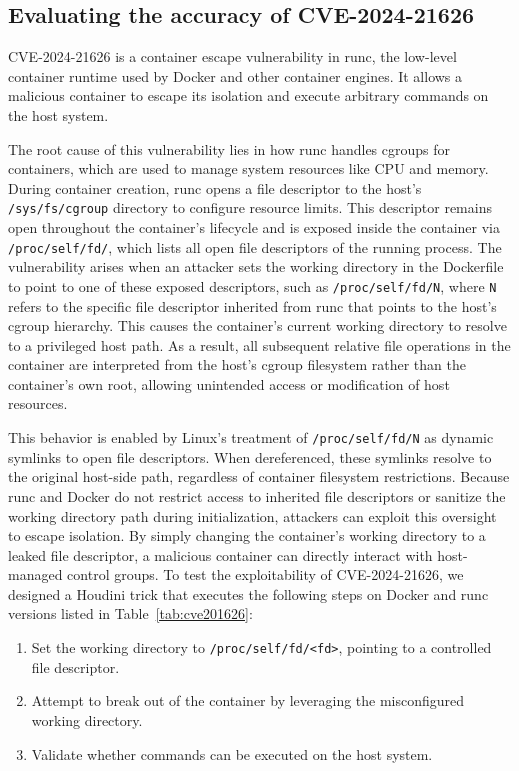 \documentclass[12pt]{report}
\begin{document}
\fontsize{12pt}{14pt} \selectfont
\begin{doublespace}




\section{Evaluating the accuracy of CVE-2024-21626}

CVE-2024-21626 \cite{runc-cve-2024-21626} is a container escape vulnerability in runc, the low-level container runtime used by Docker and other container engines. It allows a malicious container to escape its isolation and execute arbitrary commands on the host system.

The root cause of this vulnerability lies in how runc handles cgroups for containers, which are used to manage system resources like CPU and memory. During container creation, runc opens a file descriptor to the host's \texttt{/sys/fs/cgroup} directory to configure resource limits. This descriptor remains open throughout the container’s lifecycle and is exposed inside the container via \texttt{/proc/self/fd/}, which lists all open file descriptors of the running process. The vulnerability arises when an attacker sets the working directory in the Dockerfile to point to one of these exposed descriptors, such as \texttt{/proc/self/fd/N}, where \texttt{N} refers to the specific file descriptor inherited from runc that points to the host’s cgroup hierarchy. This causes the container’s current working directory to resolve to a privileged host path. As a result, all subsequent relative file operations in the container are interpreted from the host’s cgroup filesystem rather than the container’s own root, allowing unintended access or modification of host resources.

This behavior is enabled by Linux's treatment of \texttt{/proc/self/fd/N} as dynamic symlinks to open file descriptors. When dereferenced, these symlinks resolve to the original host-side path, regardless of container filesystem restrictions. Because runc and Docker do not restrict access to inherited file descriptors or sanitize the working directory path during initialization, attackers can exploit this oversight to escape isolation. By simply changing the container's working directory to a leaked file descriptor, a malicious container can directly interact with host-managed control groups.
To test the exploitability of CVE-2024-21626, we designed a Houdini trick that executes the following steps on Docker and runc versions listed in Table~\ref{tab:cve201626}:
\begin{enumerate}
    \item Set the working directory to \texttt{/proc/self/fd/<fd>}, pointing to a controlled file descriptor.
    \item Attempt to break out of the container by leveraging the misconfigured working directory.
    \item Validate whether commands can be executed on the host system.
\end{enumerate}


\end{doublespace}
\end{document}
